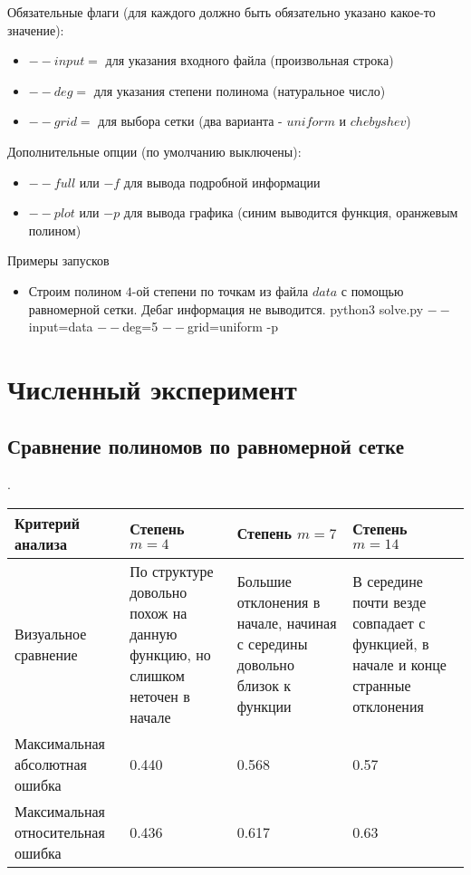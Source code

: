 \documentclass[paper=a4, fontsize=11pt]{scrartcl} %
\numberwithin{equation}{section} %
\numberwithin{figure}{section} %
\numberwithin{table}{section} %
\begin{document}
Обязательные флаги (для каждого должно быть обязательно указано какое-то значение):

\begin{itemize}
	\item $--input=$ для указания входного файла (произвольная строка)
    \item $--deg=$ для указания степени полинома (натуральное число)
    \item $--grid=$ для выбора сетки (два варианта - $uniform$ и $chebyshev$)
\end{itemize}

Дополнительные опции (по умолчанию выключены):

\begin{itemize}
	\item $--full$ или $-f$ для вывода подробной информации 
    \item $--plot$ или $-p$ для вывода графика (синим выводится функция, оранжевым полином)
\end{itemize}

Примеры запусков

\begin{itemize}

	\item Строим полином $4$-ой степени по точкам из файла $data$ с помощью равномерной сетки. Дебаг информация не выводится.
	\subitem python3 solve.py $--$input=data $--$deg=5 $--$grid=uniform -p 
   
\end{itemize}


\section{Численный эксперимент}

\subsection{Сравнение полиномов по равномерной сетке}
.

\begin{tabular}{|p{4 cm}|p{4 cm}|p{4 cm}|p{4 cm}|}
\hline
	Критерий анализа & Степень $m=4$ & Степень $m=7$ & Степень $m=14$\\
\hline
	Визуальное сравнение & По структуре довольно похож на данную функцию, но слишком неточен в начале & Большие отклонения в начале, начиная с середины довольно близок к функции & В середине почти везде совпадает с функцией, в начале и конце странные отклонения\\
\hline
	Максимальная абсолютная ошибка & 0.440 & 0.568 & 0.57\\
\hline
	Максимальная относительная ошибка & 0.436 & 0.617 & 0.63\\
\hline
\end{tabular}
\end{document}
